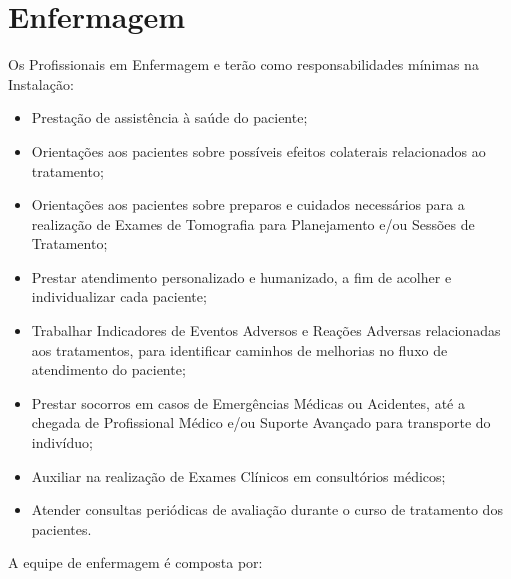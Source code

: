 \section{Enfermagem}
Os Profissionais em Enfermagem e terão como responsabilidades mínimas na Instalação:
\begin{itemize}
    \item Prestação de assistência à saúde do paciente;
    \item Orientações aos pacientes sobre possíveis efeitos colaterais relacionados ao tratamento;
    \item Orientações aos pacientes sobre preparos e cuidados necessários para a realização de Exames de Tomografia para Planejamento e/ou Sessões de Tratamento;
    \item Prestar atendimento personalizado e humanizado, a fim de acolher e individualizar cada paciente;
    \item Trabalhar Indicadores de Eventos Adversos e Reações Adversas relacionadas aos tratamentos, para identificar caminhos de melhorias no fluxo de atendimento do paciente;
    \item Prestar socorros em casos de Emergências Médicas ou Acidentes, até a chegada de Profissional Médico e/ou Suporte Avançado para transporte do indivíduo;
    \item Auxiliar na realização de Exames Clínicos em consultórios médicos;
    \item Atender consultas periódicas de avaliação durante o curso de tratamento dos pacientes.
\end{itemize}

A equipe de enfermagem é composta por:

\begin{table}[!h]
    \centering
    \caption{Equipe de Enfermagem.}
    \label{tab:enfermagem}
\end{table}
